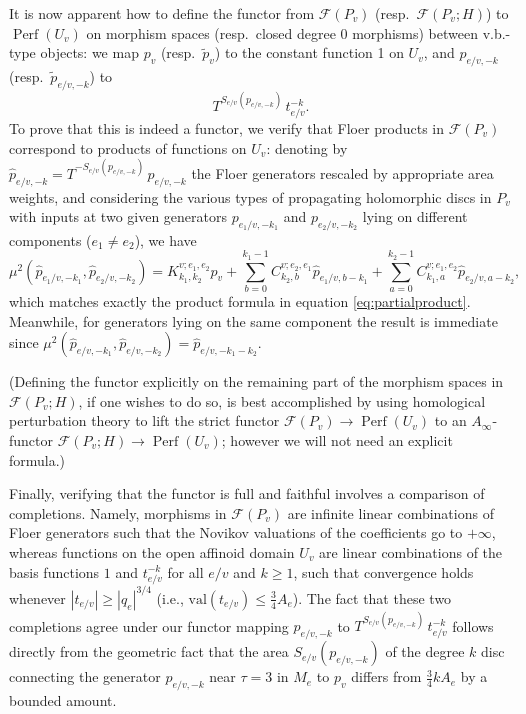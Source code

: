 \documentclass[11pt,leqno]{amsart}
\numberwithin{equation}{section}
\def\val{\mathrm{val}}
\newcommand{\cF}{{\mathcal F}}
\newcommand{\Perf}{\operatorname{Perf}}
\begin{document}
It is now apparent how to define the functor from $\cF(P_v)$ (resp.\
$\cF(P_v;H)$) to $\Perf(U_v)$ on morphism spaces (resp.\ closed degree 0
morphisms) between v.b.-type objects: we map
$p_v$ (resp.\ $\tilde{p}_v$) to the constant function 1 on $U_v$, and
$p_{e/v,-k}$ (resp.\ $\tilde{p}_{e/v,-k}$) to 
$$T^{S_{e/v}(p_{e/v,-k})}\, t_{e/v}^{-k}.$$
To prove that this is indeed a functor, we verify
that Floer products in $\cF(P_v)$ correspond to products of functions on
$U_v$: denoting by $\hat{p}_{e/v,-k}=T^{-S_{e/v}(p_{e/v,-k})}\,p_{e/v,-k}$
the Floer generators rescaled by appropriate area weights, and considering the
various types of propagating holomorphic discs in $P_v$ with inputs at two
given generators $p_{e_1/v,-k_1}$ and $p_{e_2/v,-k_2}$ lying on different
components ($e_1\neq e_2$), we have
$$\mu^2(\hat{p}_{e_1/v,-k_1},\hat{p}_{e_2/v,-k_2})=K^{v;e_1,e_2}_{k_1,k_2} p_v+
\sum_{b=0}^{k_1-1}C^{v;e_2,e_1}_{k_2,b} \hat{p}_{e_1/v,b-k_1} +
\sum_{a=0}^{k_2-1}C^{v;e_1,e_2}_{k_1,a} \hat{p}_{e_2/v,a-k_2},$$
which matches exactly the product formula in equation
\eqref{eq:partialproduct}. Meanwhile, for generators lying on the same
component the result is immediate since
$\mu^2(\hat{p}_{e/v,-k_1},\hat{p}_{e/v,-k_2})=\hat{p}_{e/v,-k_1-k_2}$.

(Defining the functor explicitly on the remaining part of the
morphism spaces in $\cF(P_v;H)$, if one wishes to do so, is best
accomplished by using homological perturbation theory to lift the strict
functor $\cF(P_v)\to \Perf(U_v)$ to an $A_\infty$-functor $\cF(P_v;H)\to
\Perf(U_v)$; however we will not need an explicit formula.)

Finally, verifying that the functor is full and faithful involves a
comparison of completions. Namely, morphisms in $\cF(P_v)$ are
infinite linear combinations of Floer generators such that the Novikov valuations of the
coefficients go to $+\infty$, whereas functions on the
open affinoid domain $U_v$ are linear combinations of the basis functions
$1$ and $t_{e/v}^{-k}$ for all $e/v$ and $k\geq 1$, such
that convergence holds whenever $|t_{e/v}|\geq |q_e|^{3/4}$ (i.e.,
$\val(t_{e/v})\leq \frac34 A_e$).
The fact that these two completions agree under our functor mapping
$p_{e/v,-k}$ to $T^{S_{e/v}(p_{e/v,-k})}\,t_{e/v}^{-k}$ follows directly
from the geometric fact that the area $S_{e/v}(p_{e/v,-k})$
of the degree $k$ disc connecting the generator $p_{e/v,-k}$ near
$\tau=3$ in $M_e$ to $p_v$ differs from $\frac34 k A_e$ by a bounded amount.
\medskip
\end{document}
